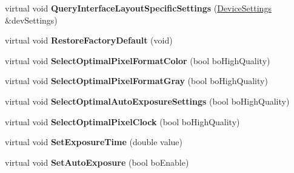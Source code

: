 \begin{DoxyCompactItemize}
\item 
\hypertarget{class_wizard_quick_setup_gen_i_cam_a7846a75fc6d7666d7f1935a5aa5e5bf3}{virtual void {\bfseries Query\+Interface\+Layout\+Specific\+Settings} (\hyperlink{struct_wizard_quick_setup_1_1_device_settings}{Device\+Settings} \&dev\+Settings)}\label{class_wizard_quick_setup_gen_i_cam_a7846a75fc6d7666d7f1935a5aa5e5bf3}

\item 
\hypertarget{class_wizard_quick_setup_gen_i_cam_ac68ed8153cbc8a03ee4eb7ffb76885ca}{virtual void {\bfseries Restore\+Factory\+Default} (void)}\label{class_wizard_quick_setup_gen_i_cam_ac68ed8153cbc8a03ee4eb7ffb76885ca}

\item 
\hypertarget{class_wizard_quick_setup_gen_i_cam_aec9a56716215336bb4b7e55f2867b7bb}{virtual void {\bfseries Select\+Optimal\+Pixel\+Format\+Color} (bool bo\+High\+Quality)}\label{class_wizard_quick_setup_gen_i_cam_aec9a56716215336bb4b7e55f2867b7bb}

\item 
\hypertarget{class_wizard_quick_setup_gen_i_cam_a0fa6f633852d139beadf157442b5abea}{virtual void {\bfseries Select\+Optimal\+Pixel\+Format\+Gray} (bool bo\+High\+Quality)}\label{class_wizard_quick_setup_gen_i_cam_a0fa6f633852d139beadf157442b5abea}

\item 
\hypertarget{class_wizard_quick_setup_gen_i_cam_a8b6cad2211d4a8d85ff80491a33425e7}{virtual void {\bfseries Select\+Optimal\+Auto\+Exposure\+Settings} (bool bo\+High\+Quality)}\label{class_wizard_quick_setup_gen_i_cam_a8b6cad2211d4a8d85ff80491a33425e7}

\item 
\hypertarget{class_wizard_quick_setup_gen_i_cam_ac4b740bedbaf5de93cc2c1aaa07456c9}{virtual void {\bfseries Select\+Optimal\+Pixel\+Clock} (bool bo\+High\+Quality)}\label{class_wizard_quick_setup_gen_i_cam_ac4b740bedbaf5de93cc2c1aaa07456c9}

\item 
\hypertarget{class_wizard_quick_setup_gen_i_cam_a93e18507c64ed79275cedc29f7874345}{virtual void {\bfseries Set\+Exposure\+Time} (double value)}\label{class_wizard_quick_setup_gen_i_cam_a93e18507c64ed79275cedc29f7874345}

\item 
\hypertarget{class_wizard_quick_setup_gen_i_cam_a3c8e1988e576644389a573f04ef63594}{virtual void {\bfseries Set\+Auto\+Exposure} (bool bo\+Enable)}\label{class_wizard_quick_setup_gen_i_cam_a3c8e1988e576644389a573f04ef63594}


\end{DoxyCompactItemize}
